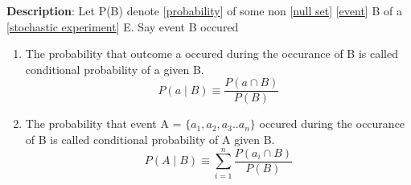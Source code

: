 \documentclass[../main.tex]{subfiles}
\begin{document}
\begin{statement}
\label{statement:Conditional Probability}\hspace*{0pt}\par
\end{statement}
\textbf{Description}:
Let P(B) denote [\hyperref[statement:Probability]{probability}] of some non [\hyperref[statement:Null Set]{null set}] [\hyperref[statement:Event]{event}] B of a [\hyperref[statement:Stochastic Experiment]{stochastic experiment}] E.
Say event B occured
\begin{enumerate}[nolistsep]
    \item The probability that outcome a occured during the occurance of B is called conditional probability of a given B.
    \[
      P(a \mid B) \equiv \frac{P(a \cap B)}{P(B)}
    \]
    \item The probability that event A = $\{a_1, a_2, a_3 .. a_n\}$ occured during the occurance of B is called conditional probability of A given B.
    \[
      P(A \mid B) \equiv \sum_{i = 1}^{n}\frac{P(a_i \cap B)}{P(B)}
    \]
\end{enumerate}
\par
\end{document}
